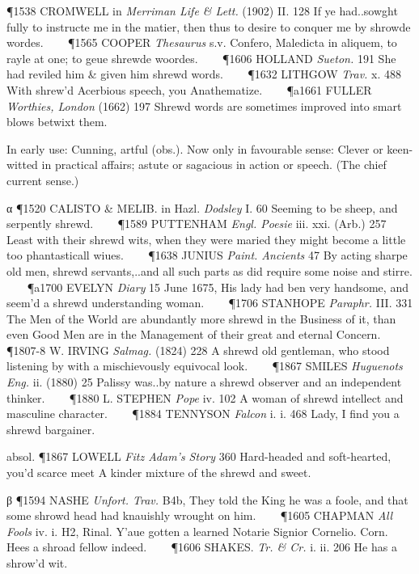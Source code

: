 \begin{description}[wide, labelwidth=!, labelindent=0pt]
\begin{myenumerate}
\P 1538 CROMWELL in  \textit{Merriman Life \& Lett.} (1902) II. 128 If ye had..sowght fully to instructe me in the matier, then thus to desire to conquer me by shrowde wordes.    
\P 1565 COOPER  \textit{Thesaurus} s.v. Confero, Maledicta in aliquem, to rayle at one; to geue shrewde woordes.    
\P 1606 HOLLAND  \textit{Sueton.} 191 She had reviled him \& given him shrewd words.    
\P 1632 LITHGOW  \textit{Trav.} x. 488 With shrew'd Acerbious speech, you Anathematize.    
\P a1661 FULLER  \textit{Worthies, London} (1662) 197 Shrewd words are sometimes improved into smart blows betwixt them.

 In early use: Cunning, artful (obs.). Now only in favourable sense: Clever or keen-witted in practical affairs; astute or sagacious in action or speech. (The chief current sense.)

α \P 1520 CALISTO \& MELIB. in  Hazl. \textit{Dodsley} I. 60 Seeming to be sheep, and serpently shrewd.    
\P 1589 PUTTENHAM  \textit{Engl. Poesie} iii. xxi. (Arb.) 257 Least with their shrewd wits, when they were maried they might become a little too phantasticall wiues.    
\P 1638 JUNIUS  \textit{Paint. Ancients} 47 By acting sharpe old men, shrewd servants,..and all such parts as did require some noise and stirre.    
\P a1700 EVELYN  \textit{Diary} 15 June 1675, His lady had ben very handsome, and seem'd a shrewd understanding woman.    
\P 1706 STANHOPE  \textit{Paraphr.} III. 331 The Men of the World are abundantly more shrewd in the Business of it, than even Good Men are in the Management of their great and eternal Concern.    
\P 1807-8 W. IRVING  \textit{Salmag.} (1824) 228 A shrewd old gentleman, who stood listening by with a mischievously equivocal look.    
\P 1867 SMILES  \textit{Huguenots Eng.} ii. (1880) 25 Palissy was..by nature a shrewd observer and an independent thinker.    
\P 1880 L. STEPHEN  \textit{Pope} iv. 102 A woman of shrewd intellect and masculine character.    
\P 1884 TENNYSON  \textit{Falcon} i. i. 468 Lady, I find you a shrewd bargainer.

\noindent absol. \P 1867 LOWELL  \textit{Fitz Adam's Story} 360 Hard-headed and soft-hearted, you'd scarce meet A kinder mixture of the shrewd and sweet.

β \P 1594 NASHE  \textit{Unfort. Trav.} B4b, They told the King he was a foole, and that some shrowd head had knauishly wrought on him.    
\P 1605 CHAPMAN  \textit{All Fools} iv. i. H2, Rinal. Y'aue gotten a learned Notarie Signior Cornelio. Corn. Hees a shroad fellow indeed.    
\P 1606 SHAKES.  \textit{Tr. \& Cr.} i. ii. 206 He has a shrow'd wit.


\end{myenumerate}
\end{description}
